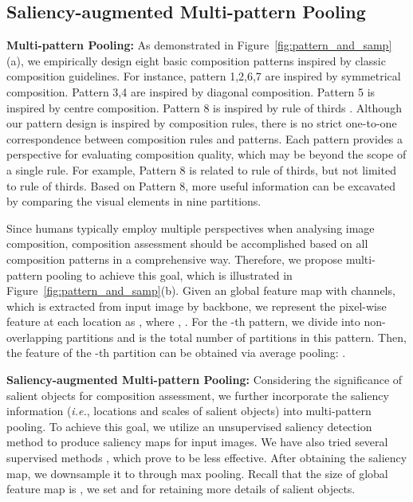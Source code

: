 \documentclass{bmvc2k}
\begin{document}
\subsection{Saliency-augmented Multi-pattern Pooling}

\noindent\textbf{Multi-pattern Pooling:} As demonstrated in Figure~\ref{fig:pattern_and_samp}(a), we empirically design eight basic composition patterns inspired by classic composition guidelines. \textcolor[rgb]{0,0,0}{For instance, pattern 1,2,6,7 are inspired by symmetrical composition.
Pattern 3,4 are inspired by diagonal composition.
Pattern 5 is inspired by centre composition.
Pattern 8 is inspired by rule of thirds \cite{thommes2018instagram,Lee2018PhotographicCC}.
Although our pattern design is inspired by composition rules, there is no strict one-to-one correspondence between composition rules and patterns. Each pattern provides a perspective for evaluating composition quality, which may be beyond the scope of a single rule.  For example, Pattern 8 is related to rule of thirds, but not limited to rule of thirds. Based on Pattern 8, more useful information can be excavated by comparing the visual elements in nine partitions.}


Since humans typically employ multiple perspectives when analysing image composition, composition assessment should be accomplished based on all composition patterns in a comprehensive way.
Therefore, we propose multi-pattern pooling to achieve this goal, which is illustrated in Figure~\ref{fig:pattern_and_samp}(b). Given an  global feature map  with  channels, which is extracted from input image by backbone, we represent the pixel-wise feature at each location as , where , . For the -th pattern, we divide  into  non-overlapping partitions  and  is the total number of partitions in this pattern. Then, the feature of the -th partition can be obtained via average pooling: .



\noindent\textbf{Saliency-augmented Multi-pattern Pooling:} 
Considering the significance of salient objects for composition assessment, we further incorporate the saliency information (\emph{i.e.}, locations and scales of salient objects) into multi-pattern pooling. 
To achieve this goal, we utilize an unsupervised saliency detection method \cite{Hou2007SaliencyDA} to produce saliency maps for input images. We have also tried several supervised methods \cite{hou2017deeply,cornia2018predicting,Zhao_2019_CVPR}, which prove to be less effective. 
After obtaining the saliency map, we downsample it to  through max pooling. Recall that the size of global feature map is , we set  and  for retaining more details of salient objects. 
\end{document}
